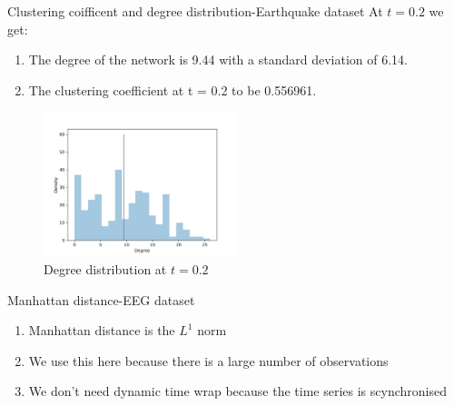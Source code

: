 \begin{frame}{Clustering coifficent and degree distribution-Earthquake dataset}
At $t=0.2$ we get:
\begin{enumerate}[$\bullet$]
    \item The degree of the network is 9.44 with a standard deviation of 6.14.\pause
    \item The clustering coefficient at t = 0.2 to be 0.556961.
\end{enumerate}
\end{frame}
\begin{figure}
    \centering
    \includegraphics[width=0.5\textwidth]{images/normalizeddegreeDensity(2).jpg}
    \caption{Degree distribution at $t=0.2$}
    \label{fig:my_label}
\end{figure}


\begin{frame}{Manhattan distance-EEG dataset}
    \begin{enumerate}[$\bullet$]
        \item Manhattan distance is the $L^1$ norm\pause
        \item We use this here because there is a large number of observations\pause
        \item We don't need dynamic time wrap because the time series is scynchronised
    \end{enumerate}
\end{frame}




